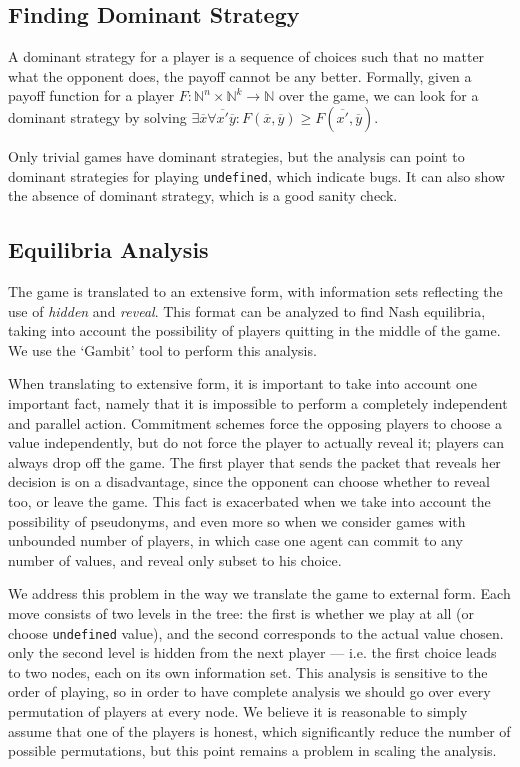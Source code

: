 \documentclass[acmsmall,review,anonymous]{acmart}\settopmatter{printfolios=true,printccs=false,printacmref=false}
\begin{document}
\subsection{Finding Dominant Strategy}
A dominant strategy for a player is a sequence of choices such that no matter what the opponent does, the payoff cannot be any better. Formally, given a payoff function for a player
$F : \mathbb{N}^n \times \mathbb{N}^k \rightarrow \mathbb{N}$
over the game, we can look for a dominant strategy by solving
$\exists \overline{x} \forall \overline{x'} \overline{y}: F(\overline{x}, \overline{y})\geq F(\overline{x'}, \overline{y})$.

Only trivial games have dominant strategies, but the analysis can point to dominant strategies for playing \texttt{undefined}, which indicate bugs. It can also show the absence of dominant strategy, which is a good sanity check.

\subsection{Equilibria Analysis}
The game is translated to an extensive form, with information sets reflecting the use of \emph{hidden} and \emph{reveal}.
This format can be analyzed to find Nash equilibria, taking into account the possibility of players quitting in the middle of the game. We use the `Gambit' tool to perform this analysis.

When translating to extensive form, it is important to take into account one important fact, namely that it is impossible to perform a completely independent and parallel action. Commitment schemes force the opposing players to choose a value independently, but do not force the player to actually reveal it; players can always drop off the game. The first player that sends the packet that reveals her decision is on a disadvantage, since the opponent can choose whether to reveal too, or leave the game. This fact is exacerbated when we take into account the possibility of pseudonyms, and even more so when we consider games with unbounded number of players, in which case one agent can commit to any number of values, and reveal only subset to his choice.

We address this problem in the way we translate the game to external form. Each move consists of two levels in the tree: the first is whether we play at all (or choose \texttt{undefined} value), and the second corresponds to the actual value chosen. only the second level is hidden from the next player --- i.e. the first choice leads to two nodes, each on its own information set. This analysis is sensitive to the order of playing, so in order to have complete analysis we should go over every permutation of players at every node. We believe it is reasonable to simply assume that one of the players is honest, which significantly reduce the number of possible permutations, but this point remains a problem in scaling the analysis.
\end{document}
